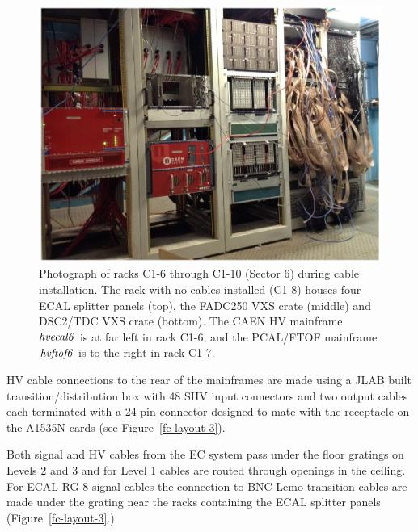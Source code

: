 \documentclass[letterpaper,10pt]{article}
\begin{document}
\begin{figure}[htbp]
  \centering
  \includegraphics[width= 5in, keepaspectratio = true]{Sector6-electronics}
  \vspace{2mm}
  \caption{Photograph of racks C1-6 through C1-10 (Sector 6) during cable installation.  The rack with no cables installed (C1-8)
  houses four ECAL splitter panels (top), the FADC250 VXS crate (middle) and DSC2/TDC VXS crate (bottom).  The CAEN HV mainframe $\it{hvecal6}$ is at far left in rack C1-6, and the PCAL/FTOF mainframe $\it{hvftof6}$ is to the right in rack C1-7.}
  \label{fc-layout-2} 
\end{figure}
HV cable connections to the rear of the mainframes are made using a JLAB built transition/distribution box with 48 SHV input connectors and two output cables each terminated with a 24-pin connector designed to mate with the receptacle on the A1535N cards (see Figure~\ref{fc-layout-3}).

Both signal and HV cables from the EC system pass under the floor gratings on Levels 2 and 3 and for Level 1
cables are routed through openings in the ceiling.  For ECAL RG-8 signal cables the connection to BNC-Lemo transition cables
are made under the grating near the racks containing the ECAL splitter panels (Figure~\ref{fc-layout-3}.)
\end{document}
